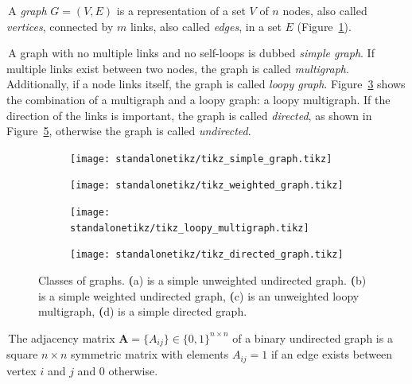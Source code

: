 \noindent\textbullet \,A \emph{graph} $G=(V,E)$ is a representation of a set $V$ of $n$ nodes, also called \emph{vertices}, connected by $m$ links, also called \emph{edges}, in a set $E$ (Figure~\ref{fig:simple_unweighted_graph}).

\noindent\textbullet \,A graph with no multiple links and no self-loops is dubbed \emph{simple graph}.
If multiple links exist between two nodes, the graph is called \emph{multigraph}.
Additionally, if a node links itself, the graph is called \emph{loopy graph}.
Figure~\ref{fig:loopy_multigraph} shows the combination of a multigraph and a loopy graph: a loopy multigraph.
If the direction of the links is important, the graph is called \emph{directed}, as shown in Figure~\ref{fig:directedgraph}, otherwise the graph is called \emph{undirected}.

\begin{figure}[htb!]
\centering
    \begin{subfigure}[hb]{0.4\textwidth}\centering
        \texttt{[image: standalonetikz/tikz\_simple\_graph.tikz]}
        \caption{}
        \label{fig:simple_unweighted_graph}
    \end{subfigure}
    \begin{subfigure}[hb]{0.4\textwidth}\centering
    \texttt{[image: standalonetikz/tikz\_weighted\_graph.tikz]}
    \caption{}
    \label{fig:simple_weighted_graph}
    \end{subfigure}
    \begin{subfigure}[hb]{0.4\textwidth}\centering
    \texttt{[image: standalonetikz/tikz\_loopy\_multigraph.tikz]}
    \caption{}
    \label{fig:loopy_multigraph}
    \end{subfigure}
    \begin{subfigure}[hb]{0.4\textwidth}\centering
    \texttt{[image: standalonetikz/tikz\_directed\_graph.tikz]}
    \caption{}
    \label{fig:directedgraph}
    \end{subfigure}
    \caption{Classes of graphs.
{\textbf (a)} is a simple unweighted undirected graph.
{\textbf (b)} is a simple weighted undirected graph, {\textbf (c)} is an unweighted loopy multigraph, {\textbf (d)} is a simple directed graph.}
\end{figure}

\noindent\textbullet \,The adjacency matrix $\mathbf{A}=\{A_{ij}\} \in \{0,1\}^{n \times n}$ of a binary undirected graph is a square $n\times n$ symmetric matrix with elements $A_{ij}=1$ if an edge exists between vertex $i$ and $j$ and $0$ otherwise.

